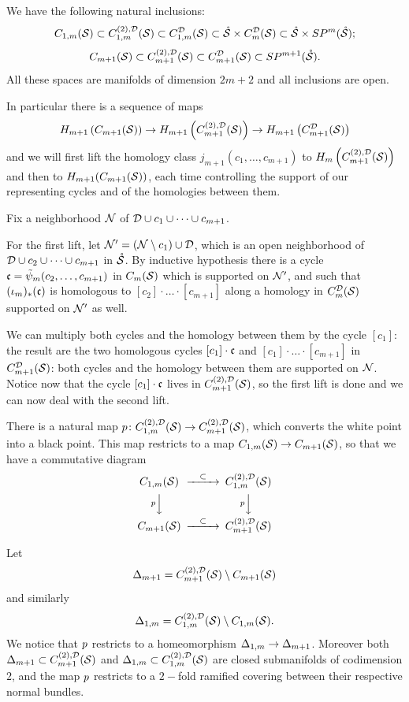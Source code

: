  
We have the following natural inclusions:
\[
C_{1,m}(\S)\subset\fmstwoD\subset\fmsD\subset\mrS\times\cmsD\subset\mrS\times\SP^m(\mrS);
\]
\[
C_{m+1}(\S)\subset\cmstwoD\subset C_{m+1}^{\D}(\S)\subset\SP^{m+1}(\mrS).
\]
All these spaces are
manifolds of dimension $2m+2$ and all inclusions are open.

In particular there is a sequence of maps
\[
 H_{m+1}\pa{C_{m+1}(\S)}\to H_{m+1}\pa{\cmstwoD}\to H_{m+1}\pa{C_{m+1}^{\D}(\S)}
\]
and we will first lift the homology class $j_{m+1}(c_1,\dots,c_{m+1})$ to $H_m\pa{\cmstwoD}$ and
then to $H_{m+1}(C_{m+1}(\S))$, each time controlling the support of our representing
cycles and of the homologies between them.

Fix a neighborhood $\N$ of $\D\cup c_1\cup\dots\cup c_{m+1}$.

For the first lift, let $\N'=\pa{\N\setminus c_1}\cup\D$, which is an open
neighborhood of $\D\cup c_2\cup\dots\cup c_{m+1}$ in $\mrS$. By inductive hypothesis
there is a cycle $\fc=\tpsi_m(c_2,\dots,c_{m+1})$ in $\cms$ which is supported on $\N'$,
and such that $(\iota_m)_*(\fc)$ is homologous to $[c_2]\cdot\ldots\cdot[c_{m+1}]$
along a homology in $\cmsD$ supported on $\N'$ as well.

We can multiply both
cycles and the homology between them by the cycle $[c_1]$: the result are the two homologous cycles
$[c_1]\cdot \fc$ and $[c_1]\cdot\ldots\cdot[c_{m+1}]$ in $C_{m+1}^{\D}(\S)$: both cycles and the
homology between them are supported on $\N$. Notice now that the
cycle $[c_1]\cdot\fc$ lives in $\cmstwoD$, so the first lift is done and we can now
deal with the second lift.

There is a natural map $\p\colon \fmstwoD\to \cmstwoD$, which converts the white point
into a black point. This map restricts to %
a map $C_{1,m}(\S)\to C_{m+1}(\S)$, so that
we have a commutative diagram
 \begin{equation}\label{eq:cmstwodiagram}
  \begin{CD}
   C_{1,m}(\S) @>\subset >> \fmstwoD %
\\   @V\p VV @V\p VV %
\\   C_{m+1}(\S) @>\subset >> \cmstwoD %
   \end{CD}
\end{equation}

\begin{defn}
\label{defn:falsediagonals} 
Let 
\[
\Dmone=\cmstwoD\setminus C_{m+1}(\S)
\]
and similarly
\[
\Donem=\fmstwoD\setminus C_{1,m}(\S).
\]
We notice that $\p$ restricts to a homeomorphism $\Donem\to\Dmone$. Moreover both $\Dmone\subset\cmstwoD$
and $\Donem\subset\fmstwoD$ are closed submanifolds of codimension $2$, and the map $\p$ restricts to
a $2-$fold ramified covering between their respective normal bundles.
\end{defn}

